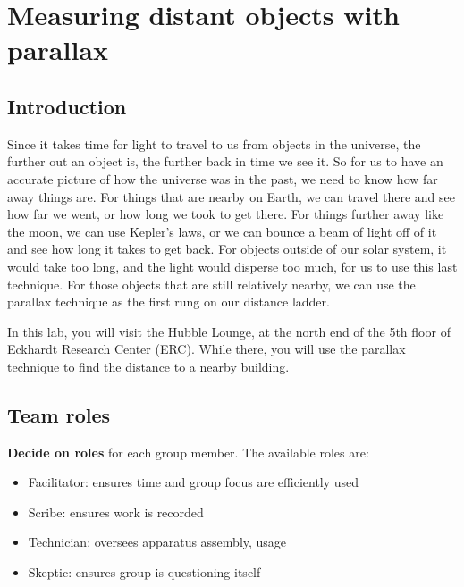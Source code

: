 \chapter{Measuring distant objects with parallax}




\section{Introduction}

Since it takes time for light to travel to us from objects in the universe, the further out an object is, the further back in time we see it. So for us to have an accurate picture of how the universe was in the past, we need to know how far away things are. For things that are nearby on Earth, we can travel there and see how far we went, or how long we took to get there. For things further away like the moon, we can use Kepler's laws, or we can bounce a beam of light off of it and see how long it takes to get back. For objects outside of our solar system, it would take too long, and the light would disperse too much, for us to use this last technique. For those objects that are still relatively nearby, we can use the parallax technique as the first rung on our distance ladder.

In this lab, you will visit the Hubble Lounge, at the north end of the 5th floor of Eckhardt Research Center (ERC). While there, you will use the parallax technique to find the distance to a nearby building.

\section{Team roles}

\textbf{Decide on roles} for each group member. The available roles are:

\begin{itemize}
	\item Facilitator: ensures time and group focus are efficiently used
	\item Scribe: ensures work is recorded
	\item Technician: oversees apparatus assembly, usage
	\item Skeptic: ensures group is questioning itself
\end{itemize}

